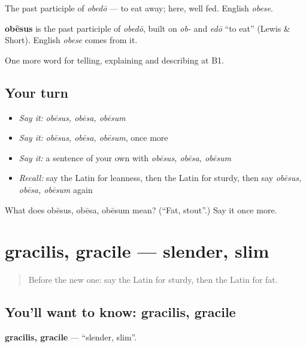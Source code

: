The past participle of \emph{obedō} — to eat away; here, well fed. English \emph{obese}.

\begin{cousinweb}
\textbf{obēsus} is the past participle of \emph{obedō}, built on \emph{ob-} and \emph{edō} \textquotedblleft{}to eat\textquotedblright{} (Lewis \& Short). English \emph{obese} comes from it.
\end{cousinweb}

\begin{grammarlens}[title={What you've built}]
One more word for telling, explaining and describing at B1.
\end{grammarlens}

\subsection*{Your turn}
\begin{itemize}
\raggedright
  \item \emph{Say it:} \emph{obēsus, obēsa, obēsum}
  \item \emph{Say it:} \emph{obēsus, obēsa, obēsum}, once more
  \item \emph{Say it:} a sentence of your own with \emph{obēsus, obēsa, obēsum}
  \item \emph{Recall:} say the Latin for leanness, then the Latin for sturdy, then say \emph{obēsus, obēsa, obēsum} again
\end{itemize}

\begin{tcolorbox}[breakable,colback=teal!4,colframe=teal!35!black,title={Before you move on}]
What does obēsus, obēsa, obēsum mean? (\textquotedblleft{}Fat, stout\textquotedblright{}.) Say it once more.
\end{tcolorbox}
\section[gracilis, gracile]{gracilis, gracile — slender, slim}

\label{lesson:LA-C523-gracilis}



\begin{quote}
Before the new one: say the Latin for sturdy, then the Latin for fat.
\end{quote}

\subsection*{You'll want to know: gracilis, gracile}
\textbf{gracilis, gracile} — \textquotedblleft{}slender, slim\textquotedblright{}.

